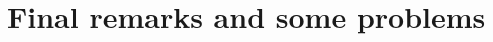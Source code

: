 \documentclass[11pt,oneside,a4papper]{osajnl}
\begin{document}

\section{Final remarks and some problems}
\label{sec:final_remarks}
\end{document}
